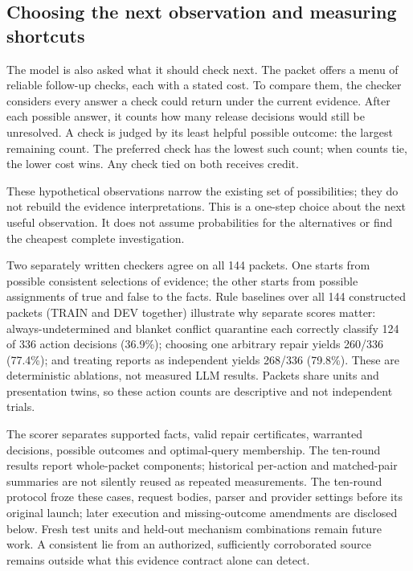 \documentclass[a4paper,preprint,12pt,numbers,nopreprintline]{elsarticle}
\begin{document}
\subsection{Choosing the next observation and measuring shortcuts}
The model is also asked what it should check next. The packet offers a menu of reliable follow-up checks, each with a stated cost. To compare them, the checker considers every answer a check could return under the current evidence. After each possible answer, it counts how many release decisions would still be unresolved. A check is judged by its least helpful possible outcome: the largest remaining count. The preferred check has the lowest such count; when counts tie, the lower cost wins. Any check tied on both receives credit.

These hypothetical observations narrow the existing set of possibilities; they do not rebuild the evidence interpretations. This is a one-step choice about the next useful observation. It does not assume probabilities for the alternatives or find the cheapest complete investigation.

Two separately written checkers agree on all 144 packets. One starts from possible consistent selections of evidence; the other starts from possible assignments of true and false to the facts. Rule baselines over all 144 constructed packets (TRAIN and DEV together) illustrate why separate scores matter: always-undetermined and blanket conflict quarantine each correctly classify 124 of 336 action decisions (36.9\%); choosing one arbitrary repair yields 260/336 (77.4\%); and treating reports as independent yields 268/336 (79.8\%). These are deterministic ablations, not measured LLM results. Packets share units and presentation twins, so these action counts are descriptive and not independent trials.

The scorer separates supported facts, valid repair certificates, warranted decisions, possible outcomes and optimal-query membership. The ten-round results report whole-packet components; historical per-action and matched-pair summaries are not silently reused as repeated measurements. The ten-round protocol froze these cases, request bodies, parser and provider settings before its original launch; later execution and missing-outcome amendments are disclosed below. Fresh test units and held-out mechanism combinations remain future work. A consistent lie from an authorized, sufficiently corroborated source remains outside what this evidence contract alone can detect.
\end{document}
